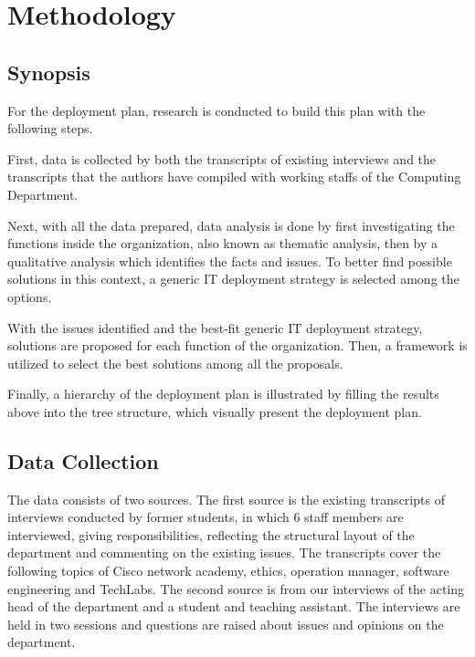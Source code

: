 
\section{Methodology}

\subsection{Synopsis}

For the deployment plan, research is conducted to build this plan with the following steps.

First, data is collected by both the transcripts of existing interviews and the transcripts that the authors have compiled with working staffs of the Computing Department.

Next, with all the data prepared, data analysis is done by first investigating the functions inside the organization, also known as thematic analysis, then by a qualitative analysis which identifies the facts and issues. To better find possible solutions in this context, a generic IT deployment strategy is selected among the options.

With the issues identified and the best-fit generic IT deployment strategy, solutions are proposed for each function of the organization. Then, a framework is utilized to select the best solutions among all the proposals.

Finally, a hierarchy of the deployment plan is illustrated by filling the results above into the tree structure, which visually present the deployment plan.


\subsection{Data Collection}	
The data consists of two sources. The first source is the existing transcripts of interviews conducted by former students, in which 6 staff members are interviewed, giving responsibilities, reflecting the structural layout of the department and commenting on the existing issues. The transcripts cover the following topics of Cisco network academy, ethics, operation manager, software engineering and TechLabs.
The second source is from our interviews of the acting head of the department and a student and teaching assistant. The interviews are held in two sessions and questions are raised about issues and opinions on the department.

